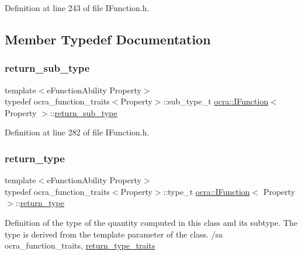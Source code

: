 Definition at line 243 of file I\+Function.\+h.



\subsection{Member Typedef Documentation}
\hypertarget{classocra_1_1IFunction_ac6604adbd04613e1f545fb522cedbe3d}{}\label{classocra_1_1IFunction_ac6604adbd04613e1f545fb522cedbe3d} 
\subsubsection{\texorpdfstring{return\+\_\+sub\+\_\+type}{return\_sub\_type}}
{\footnotesize\ttfamily template$<$e\+Function\+Ability Property$>$ \\
typedef ocra\+\_\+function\+\_\+traits$<$Property$>$\+::sub\+\_\+type\+\_\+t \hyperlink{classocra_1_1IFunction}{ocra\+::\+I\+Function}$<$ Property $>$\+::\hyperlink{classocra_1_1IFunction_ac6604adbd04613e1f545fb522cedbe3d}{return\+\_\+sub\+\_\+type}}



Definition at line 282 of file I\+Function.\+h.

\hypertarget{classocra_1_1IFunction_a04d351c2f938d01046328b54fb7e6525}{}\label{classocra_1_1IFunction_a04d351c2f938d01046328b54fb7e6525} 
\subsubsection{\texorpdfstring{return\+\_\+type}{return\_type}}
{\footnotesize\ttfamily template$<$e\+Function\+Ability Property$>$ \\
typedef ocra\+\_\+function\+\_\+traits$<$Property$>$\+::type\+\_\+t \hyperlink{classocra_1_1IFunction}{ocra\+::\+I\+Function}$<$ Property $>$\+::\hyperlink{classocra_1_1IFunction_a04d351c2f938d01046328b54fb7e6525}{return\+\_\+type}}

Definition of the type of the quantity computed in this class and its subtype. The type is derived from the template parameter of the class. /sa ocra\+\_\+function\+\_\+traits, \hyperlink{structocra_1_1return__type__traits}{return\+\_\+type\+\_\+traits} 

